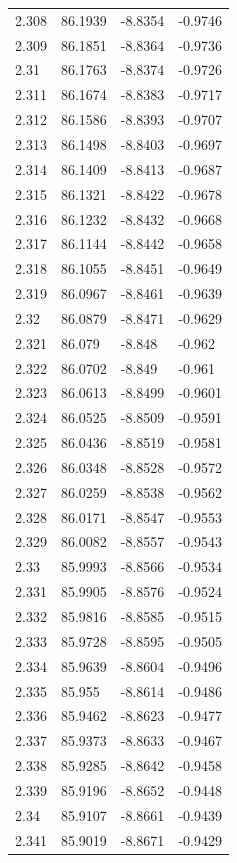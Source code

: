 \begin{tabular}{llll}
2.308 & 86.1939 & -8.8354 & -0.9746 \\
2.309 & 86.1851 & -8.8364 & -0.9736 \\
2.31 & 86.1763 & -8.8374 & -0.9726 \\
2.311 & 86.1674 & -8.8383 & -0.9717 \\
2.312 & 86.1586 & -8.8393 & -0.9707 \\
2.313 & 86.1498 & -8.8403 & -0.9697 \\
2.314 & 86.1409 & -8.8413 & -0.9687 \\
2.315 & 86.1321 & -8.8422 & -0.9678 \\
2.316 & 86.1232 & -8.8432 & -0.9668 \\
2.317 & 86.1144 & -8.8442 & -0.9658 \\
2.318 & 86.1055 & -8.8451 & -0.9649 \\
2.319 & 86.0967 & -8.8461 & -0.9639 \\
2.32 & 86.0879 & -8.8471 & -0.9629 \\
2.321 & 86.079 & -8.848 & -0.962 \\
2.322 & 86.0702 & -8.849 & -0.961 \\
2.323 & 86.0613 & -8.8499 & -0.9601 \\
2.324 & 86.0525 & -8.8509 & -0.9591 \\
2.325 & 86.0436 & -8.8519 & -0.9581 \\
2.326 & 86.0348 & -8.8528 & -0.9572 \\
2.327 & 86.0259 & -8.8538 & -0.9562 \\
2.328 & 86.0171 & -8.8547 & -0.9553 \\
2.329 & 86.0082 & -8.8557 & -0.9543 \\
2.33 & 85.9993 & -8.8566 & -0.9534 \\
2.331 & 85.9905 & -8.8576 & -0.9524 \\
2.332 & 85.9816 & -8.8585 & -0.9515 \\
2.333 & 85.9728 & -8.8595 & -0.9505 \\
2.334 & 85.9639 & -8.8604 & -0.9496 \\
2.335 & 85.955 & -8.8614 & -0.9486 \\
2.336 & 85.9462 & -8.8623 & -0.9477 \\
2.337 & 85.9373 & -8.8633 & -0.9467 \\
2.338 & 85.9285 & -8.8642 & -0.9458 \\
2.339 & 85.9196 & -8.8652 & -0.9448 \\
2.34 & 85.9107 & -8.8661 & -0.9439 \\
2.341 & 85.9019 & -8.8671 & -0.9429 \\

\end{tabular}

